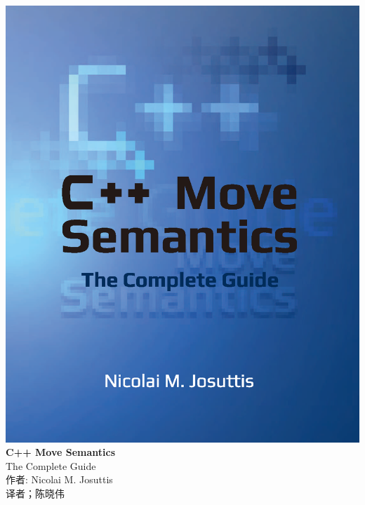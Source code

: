 \documentclass[10pt,a4paper,UTF8]{ctexart}
\begin{document}

	\begin{center}
		\includegraphics[width=1.\textwidth]{cover}
		\newpage
		\huge
		\textbf{C++ Move Semantics}
		\\[9pt]
		\normalsize
		The Complete Guide
		\\[10pt]
		\normalsize
		作者: Nicolai M. Josuttis
		\\[8pt]
		\normalsize
		译者；陈晓伟
	\end{center}

	\newpage

	\tableofcontents
	\newpage

	\pagestyle{empty}
	
	

\end{document}
